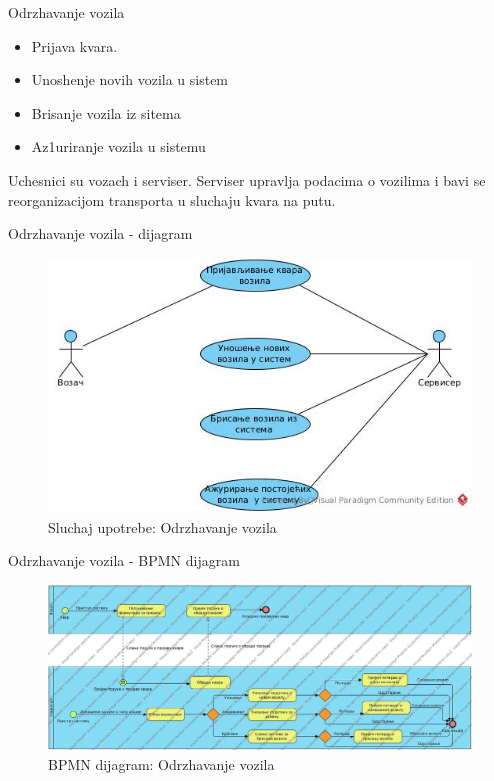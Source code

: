 \documentclass[11pt]{beamer}
\begin{document}
\begin{frame}{Odrzhavanje vozila}
    \begin{itemize}
        \item Prijava kvara.
        \item Unoshenje novih vozila u sistem 
        \item Brisanje vozila iz sitema
        \item Az1uriranje vozila u sistemu
    \end{itemize}
    Uchesnici su vozach i serviser. Serviser upravlja podacima o vozilima i bavi se reorganizacijom transporta u sluchaju kvara na putu.
\end{frame}
\begin{frame}{Odrzhavanje vozila - dijagram}
    \begin{figure}
        \centering
        \includegraphics[scale=0.6]{Slike/UML/SUodrzavanje.jpg}
        \caption{Sluchaj upotrebe: Odrzhavanje vozila}
        \label{fig:ov}
    \end{figure}    
\end{frame}
\begin{frame}{Odrzhavanje vozila - BPMN dijagram}
    \begin{figure}
        \centering
        \includegraphics[scale=0.25]{Slike/BPMN/BPMNodrzavanje.jpg}
        \caption{BPMN dijagram: Odrzhavanje vozila}
        \label{fig:bpmnov}
    \end{figure}    
\end{frame}
\end{document}
